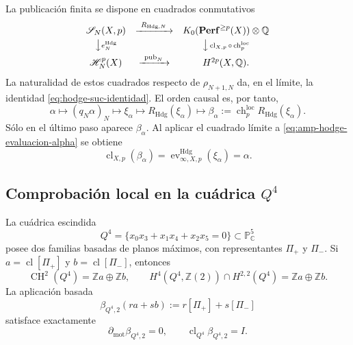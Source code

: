 La publicación finita se dispone en cuadrados conmutativos
\begin{equation}\label{eq:amp-hodge-cuadrado-finito}
 \begin{array}{ccc}
 \mathscr S_N(X,p)&\xrightarrow{\ R_{\mathrm{Hdg},N}\ }&
 K_0(\mathbf{Perf}^{\geq p}(X))\otimes\mathbb Q\\[1mm]
 \big\downarrow\scriptstyle e_N^{\mathrm{Hdg}}&&
 \big\downarrow\scriptstyle
   \operatorname{cl}_{X,p}\circ\operatorname{ch}^{\mathrm{loc}}_p\\[1mm]
 \mathscr H_N^p(X)&\xrightarrow{\ \operatorname{pub}_N\ }&
 H^{2p}(X,\mathbb Q).
 \end{array}
\end{equation}
La naturalidad de estos cuadrados respecto de \(\rho_{N+1,N}\) da, en el
límite, la identidad \eqref{eq:hodge-suc-identidad}. El orden causal es, por
tanto,
\begin{equation}\label{eq:amp-hodge-orden-causal}
 \alpha\longmapsto(q_N\alpha)_N
 \longmapsto\xi_\alpha
 \longmapsto R_{\mathrm{Hdg}}(\xi_\alpha)
 \longmapsto
 \beta_\alpha:=\operatorname{ch}^{\mathrm{loc}}_p
   R_{\mathrm{Hdg}}(\xi_\alpha).
\end{equation}
Sólo en el último paso aparece \(\beta_\alpha\). Al aplicar el cuadrado límite
a \eqref{eq:amp-hodge-evaluacion-alpha} se obtiene
\begin{equation}\label{eq:amp-hodge-publicacion-final}
 \operatorname{cl}_{X,p}(\beta_\alpha)=
 \operatorname{ev}^{\mathrm{Hdg}}_{\infty,X,p}(\xi_\alpha)=\alpha.
\end{equation}

\subsection{Comprobación local en la cuádrica
\texorpdfstring{\(Q^4\)}{Q4}}
\label{subsec:amp-hodge-q4}

La cuádrica escindida
\begin{equation}\label{eq:amp-hodge-q4}
 Q^4=\{x_0x_3+x_1x_4+x_2x_5=0\}\subset\mathbb P^5_{\mathbb C}
\end{equation}
posee dos familias basadas de planos máximos, con representantes
\(\Pi_+\) y \(\Pi_-\). Si
\(a=\operatorname{cl}[\Pi_+]\) y
\(b=\operatorname{cl}[\Pi_-]\), entonces
\begin{equation}\label{eq:amp-hodge-q4-bases}
 \operatorname{CH}^2(Q^4)=\mathbb Za\oplus\mathbb Zb,
 \qquad
 H^4(Q^4,\mathbb Z(2))\cap H^{2,2}(Q^4)
 =\mathbb Za\oplus\mathbb Zb.
\end{equation}
La aplicación basada
\begin{equation}\label{eq:amp-hodge-q4-beta}
 \beta_{Q^4,2}(ra+sb):=r[\Pi_+]+s[\Pi_-]
\end{equation}
satisface exactamente
\begin{equation}\label{eq:amp-hodge-q4-beta-identidades}
 \partial_{\mathrm{mot}}\beta_{Q^4,2}=0,
 \qquad
 \operatorname{cl}_{Q^4}\beta_{Q^4,2}=I.
\end{equation}

